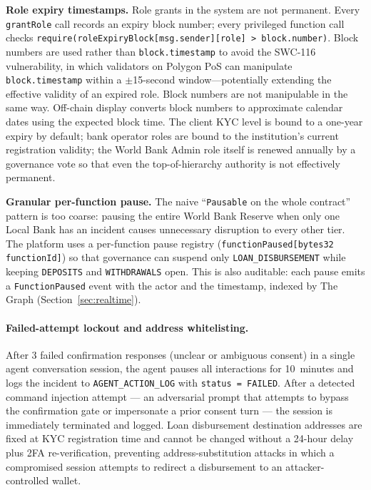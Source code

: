 \documentclass[12pt,a4paper]{report}
\begin{document}
\textbf{Role expiry timestamps.} Role grants in the system are not permanent. Every \texttt{grantRole} call records an expiry block number; every privileged function call checks \texttt{require(roleExpiryBlock[msg.sender][role] > block.number)}. Block numbers are used rather than \texttt{block.timestamp} to avoid the SWC-116 vulnerability, in which validators on Polygon PoS can manipulate \texttt{block.timestamp} within a $\pm$15-second window---potentially extending the effective validity of an expired role. Block numbers are not manipulable in the same way. Off-chain display converts block numbers to approximate calendar dates using the expected block time. The client KYC level is bound to a one-year expiry by default; bank operator roles are bound to the institution's current registration validity; the World Bank Admin role itself is renewed annually by a governance vote so that even the top-of-hierarchy authority is not effectively permanent.

\textbf{Granular per-function pause.} The naive ``\texttt{Pausable} on the whole contract'' pattern is too coarse: pausing the entire World Bank Reserve when only one Local Bank has an incident causes unnecessary disruption to every other tier. The platform uses a per-function pause registry (\texttt{functionPaused[bytes32 functionId]}) so that governance can suspend only \texttt{LOAN\_DISBURSEMENT} while keeping \texttt{DEPOSITS} and \texttt{WITHDRAWALS} open. This is also auditable: each pause emits a \texttt{FunctionPaused} event with the actor and the timestamp, indexed by The Graph (Section~\ref{sec:realtime}).

\paragraph{Failed-attempt lockout and address whitelisting.}
After 3 failed confirmation responses (unclear or ambiguous consent) in a single agent conversation session, the agent pauses all interactions for 10~minutes and logs the incident to \texttt{AGENT\_ACTION\_LOG} with \texttt{status = FAILED}. After a detected command injection attempt --- an adversarial prompt that attempts to bypass the confirmation gate or impersonate a prior consent turn --- the session is immediately terminated and logged. Loan disbursement destination addresses are fixed at KYC registration time and cannot be changed without a 24-hour delay plus 2FA re-verification, preventing address-substitution attacks in which a compromised session attempts to redirect a disbursement to an attacker-controlled wallet.
\end{document}
